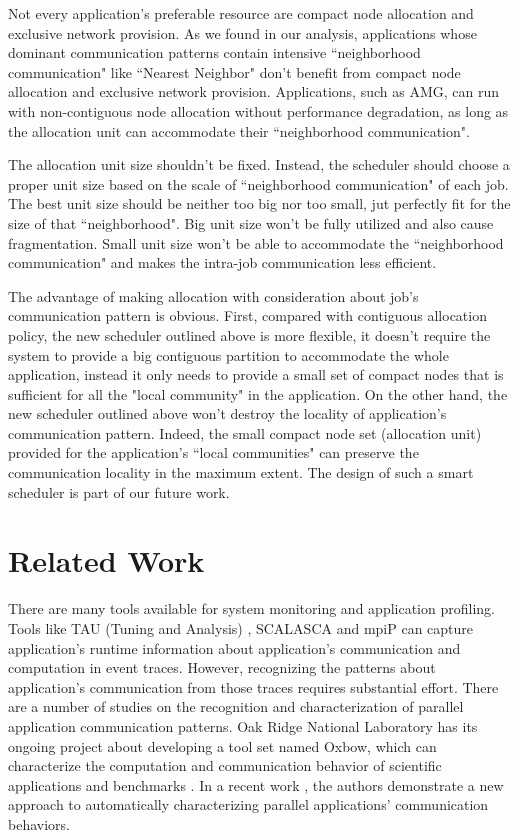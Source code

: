\documentclass[conference]{IEEEtran}
\begin{document}
Not every application's preferable resource are compact node allocation and exclusive network provision. As we found in our analysis, applications whose dominant communication patterns contain intensive ``neighborhood communication" like ``Nearest Neighbor" don't benefit from compact node allocation and exclusive network provision. Applications, such as AMG, can run with non-contiguous node allocation without performance degradation, as long as the allocation unit can accommodate their ``neighborhood communication".

The allocation unit size shouldn't be fixed. Instead, the scheduler should choose a proper unit size based on the scale of ``neighborhood communication" of each job. The best unit size should be neither too big nor too small, jut perfectly fit for the size of that ``neighborhood". Big unit size won't be fully utilized and also cause fragmentation. Small unit size won't be able to accommodate the ``neighborhood communication" and makes the intra-job communication less efficient. 


The advantage of making allocation with consideration about job's communication pattern is obvious. First, compared with contiguous allocation policy, the new scheduler outlined above is more flexible, it doesn't require the system to provide a big contiguous partition to accommodate the whole application, instead it only needs to provide a small set of compact nodes that is sufficient for all the "local community" in the application. On the other hand, the new scheduler outlined above won't destroy the locality of application's communication pattern. Indeed, the small compact node set (allocation unit) provided for the application's  ``local communities" can preserve the communication locality in the maximum extent. The design of such a smart scheduler is part of our future work. 


\section{Related Work}
\label{sec:related_work}

There are many tools available for system monitoring and application profiling. Tools like TAU (Tuning and Analysis) \cite{tau}, SCALASCA \cite{scala} and mpiP \cite{mpip} can capture application's runtime information about application's communication and computation in event traces. However, recognizing the patterns about application's communication from those traces requires substantial effort. There are a number of studies on the recognition and characterization of parallel application communication patterns. Oak Ridge National Laboratory has its ongoing project about developing a tool set named Oxbow, which can characterize the computation and communication behavior of scientific applications and benchmarks \cite{oxbow}. In a recent work \cite{roth}, the authors demonstrate a new approach to automatically characterizing parallel applications' communication behaviors. 
\end{document}
